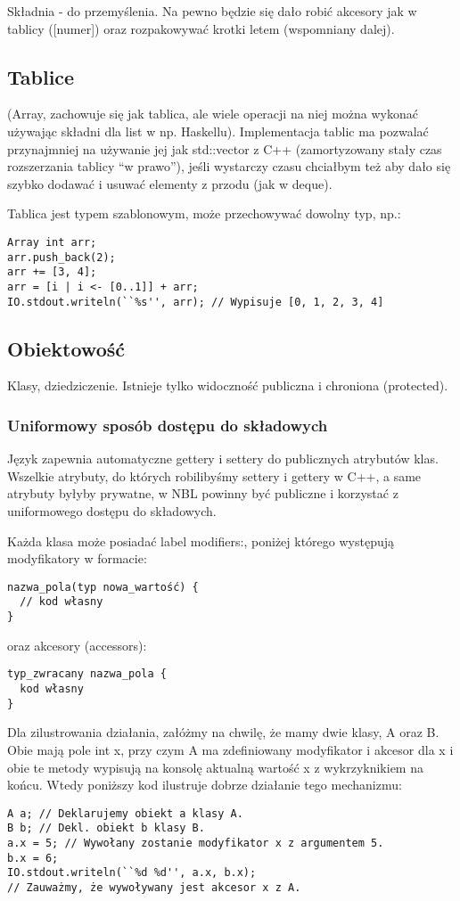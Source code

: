 \documentclass[a4paper,10pt]{scrartcl}
\begin{document}
Składnia - do przemyślenia. Na pewno będzie się dało robić akcesory jak w tablicy ([numer]) oraz rozpakowywać krotki letem (wspomniany dalej).

\subsection{Tablice}
(Array, zachowuje się jak tablica, ale wiele operacji na niej można wykonać
używając składni dla list w np. Haskellu). Implementacja tablic ma pozwalać przynajmniej na używanie jej jak std::vector z C++ (zamortyzowany stały
czas rozszerzania tablicy ``w prawo''), jeśli wystarczy czasu chciałbym też aby dało się szybko dodawać i usuwać elementy z przodu (jak w deque).

Tablica jest typem szablonowym, może przechowywać dowolny typ, np.:
\begin{lstlisting}
Array int arr;
arr.push_back(2);
arr += [3, 4];
arr = [i | i <- [0..1]] + arr;
IO.stdout.writeln(``%s'', arr);	// Wypisuje [0, 1, 2, 3, 4]
\end{lstlisting}

\subsection{Obiektowość}
Klasy, dziedziczenie. Istnieje tylko widoczność publiczna i chroniona (protected). 

\subsubsection{Uniformowy sposób dostępu do składowych}
Język zapewnia automatyczne gettery i settery do publicznych atrybutów klas. Wszelkie atrybuty, do których robilibyśmy settery i gettery w C++, a
same atrybuty byłyby prywatne, w NBL powinny być publiczne i korzystać z uniformowego dostępu do składowych.

Każda klasa może posiadać label modifiers:, poniżej którego występują modyfikatory w formacie:
\begin{lstlisting}
nazwa_pola(typ nowa_wartość) {
  // kod własny
}
\end{lstlisting}

oraz akcesory (accessors):
\begin{lstlisting}
typ_zwracany nazwa_pola {
  kod własny
}
\end{lstlisting}

Dla zilustrowania działania, załóżmy na chwilę, że mamy dwie klasy, A oraz B. Obie mają pole int x, przy czym A ma zdefiniowany modyfikator i
akcesor dla x i obie te metody wypisują na konsolę aktualną wartość x z wykrzyknikiem na końcu. Wtedy poniższy kod ilustruje dobrze działanie
tego mechanizmu:
\begin{lstlisting}
A a; // Deklarujemy obiekt a klasy A.
B b; // Dekl. obiekt b klasy B.
a.x = 5; // Wywołany zostanie modyfikator x z argumentem 5.
b.x = 6;
IO.stdout.writeln(``%d %d'', a.x, b.x); 
// Zauważmy, że wywoływany jest akcesor x z A.
\end{lstlisting}
\end{document}
